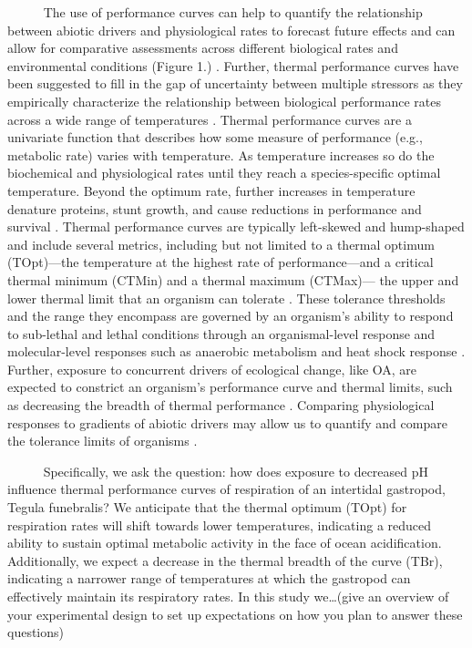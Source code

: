 \documentclass[
  12pt,
]{article}
\begin{document}
~~~~~ The use of performance curves can help to quantify the
relationship between abiotic drivers and physiological rates to forecast
future effects \cite{kroeker2017embracing} and can allow for comparative
assessments across different biological rates and environmental
conditions (Figure 1.)
\cite{schulte2011thermal, silbiger2019comparative, silva2021local, padfield2021rtpc; becker2020nutrient}.
Further, thermal performance curves have been suggested to fill in the
gap of uncertainty between multiple stressors as they empirically
characterize the relationship between biological performance rates
across a wide range of temperatures
\cite{padfield2021rtpc, schulte2011thermal, silbiger2019comparative}.
Thermal performance curves are a univariate function that describes how
some measure of performance (e.g., metabolic rate) varies with
temperature. As temperature increases so do the biochemical and
physiological rates until they reach a species-specific optimal
temperature. Beyond the optimum rate, further increases in temperature
denature proteins, stunt growth, and cause reductions in performance and
survival \cite{somero2002thermal, portner2002climate}. Thermal
performance curves are typically left-skewed and hump-shaped and include
several metrics, including but not limited to a thermal optimum
(TOpt)---the temperature at the highest rate of performance---and a
critical thermal minimum (CTMin) and a thermal maximum (CTMax)--- the
upper and lower thermal limit that an organism can tolerate
\cite{schulte2011thermal, huey1979integrating, huey1989evolution}. These
tolerance thresholds and the range they encompass are governed by an
organism's ability to respond to sub-lethal and lethal conditions
through an organismal-level response and molecular-level responses such
as anaerobic metabolism and heat shock response
\cite{portner2017oxygen, somero2002thermal}. Further, exposure to
concurrent drivers of ecological change, like OA, are expected to
constrict an organism's performance curve and thermal limits, such as
decreasing the breadth of thermal performance
\cite{portner2008physiology, portner2010oxygen}. Comparing physiological
responses to gradients of abiotic drivers may allow us to quantify and
compare the tolerance limits of organisms
\cite{silbiger2019comparative}.

~~~~~ Specifically, we ask the question: how does exposure to decreased
pH influence thermal performance curves of respiration of an intertidal
gastropod, Tegula funebralis? We anticipate that the thermal optimum
(TOpt) for respiration rates will shift towards lower temperatures,
indicating a reduced ability to sustain optimal metabolic activity in
the face of ocean acidification. Additionally, we expect a decrease in
the thermal breadth of the curve (TBr), indicating a narrower range of
temperatures at which the gastropod can effectively maintain its
respiratory rates. In this study we\ldots(give an overview of your
experimental design to set up expectations on how you plan to answer
these questions)
\end{document}
